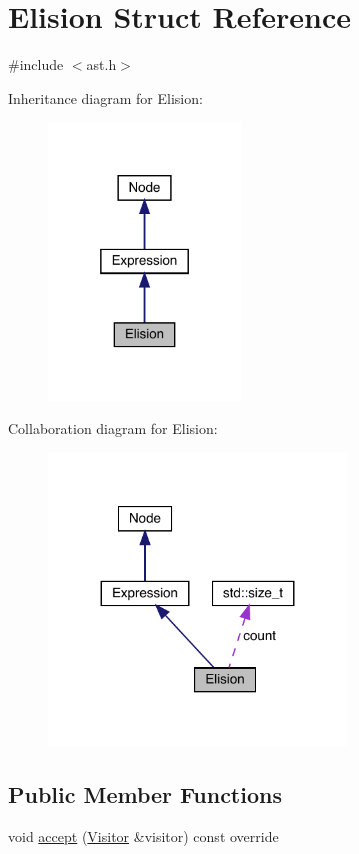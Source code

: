 \hypertarget{struct_elision}{}\section{Elision Struct Reference}
\label{struct_elision}


{\ttfamily \#include $<$ast.\+h$>$}



Inheritance diagram for Elision\+:\nopagebreak
\begin{figure}[H]
\begin{center}
\leavevmode
\includegraphics[width=145pt]{struct_elision__inherit__graph}
\end{center}
\end{figure}


Collaboration diagram for Elision\+:\nopagebreak
\begin{figure}[H]
\begin{center}
\leavevmode
\includegraphics[width=224pt]{struct_elision__coll__graph}
\end{center}
\end{figure}
\subsection*{Public Member Functions}
\begin{DoxyCompactItemize}
\item 
void \hyperlink{struct_elision_ac99f60fccfcedcf9cd090f5682b2e6dd}{accept} (\hyperlink{struct_visitor}{Visitor} \&visitor) const override
\end{DoxyCompactItemize}
